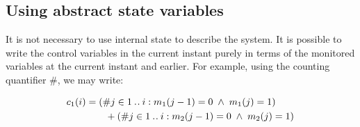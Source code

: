 \subsection{Using abstract state variables}
It is not necessary to use internal state to describe the system. It is possible to write the control variables in the current instant purely in terms of the monitored variables at the current instant and earlier. For example, using the counting quantifier \#, we may write:

\begin{align*}
c_1(i) &= (\#j \in 1\mathbin{.\mkern1mu.} i: m_1(j-1) = 0 \; \land \;  m_1(j)=1)\\
 & \qquad + (\#j \in 1\mathbin{.\mkern1mu.} i: m_2(j-1) = 0 \; \land \; m_2(j)=1)
\end{align*}














